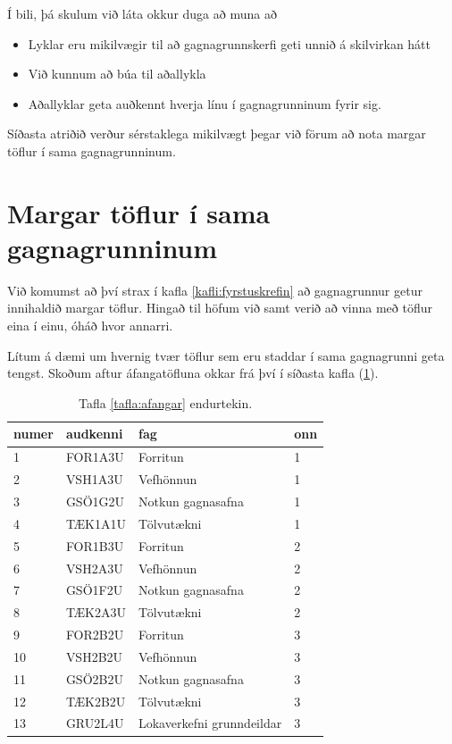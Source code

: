 Í bili, þá skulum við láta okkur duga að muna að
\begin{itemize}
 \item Lyklar eru mikilvægir til að gagnagrunnskerfi geti unnið á skilvirkan hátt
 \item Við kunnum að búa til aðallykla 
 \item Aðallyklar geta auðkennt hverja línu í gagnagrunninum fyrir sig.
\end{itemize}
Síðasta atriðið verður sérstaklega mikilvægt þegar við förum að nota margar töflur í sama gagnagrunninum.
\section{Margar töflur í sama gagnagrunninum}
Við komumst að því strax í kafla \ref{kafli:fyrstuskrefin} að gagnagrunnur getur innihaldið margar töflur. Hingað til höfum við samt verið að vinna með töflur eina í einu, óháð hvor annarri.

Lítum á dæmi um hvernig tvær töflur sem eru staddar í sama gagnagrunni geta tengst. Skoðum aftur áfangatöfluna okkar frá því í síðasta kafla (\ref{tafla:afangar-aftur}).

\begin{table}
\centering
\caption[Áfangar]{Tafla \ref{tafla:afangar} endurtekin.}
\label{tafla:afangar-aftur}
\begin{tabular}{llll}
\toprule
numer&audkenni&fag&onn\\
\midrule
1&	FOR1A3U&	Forritun&		1\\
2&	VSH1A3U&	Vefhönnun&		1\\
3&	GSÖ1G2U&	Notkun gagnasafna&	1\\
4&	TÆK1A1U&	Tölvutækni&		1\\
5&	FOR1B3U&	Forritun&		2\\
6&	VSH2A3U&	Vefhönnun&		2\\
7&	GSÖ1F2U&	Notkun gagnasafna&	2\\
8&	TÆK2A3U&	Tölvutækni&		2\\
9&	FOR2B2U&	Forritun&		3\\
10&	VSH2B2U&	Vefhönnun&		3\\
11&	GSÖ2B2U&	Notkun gagnasafna&	3\\
12&	TÆK2B2U&	Tölvutækni&		3\\
13&	GRU2L4U&	Lokaverkefni grunndeildar&3\\
\bottomrule
\end{tabular}
\end{table}

